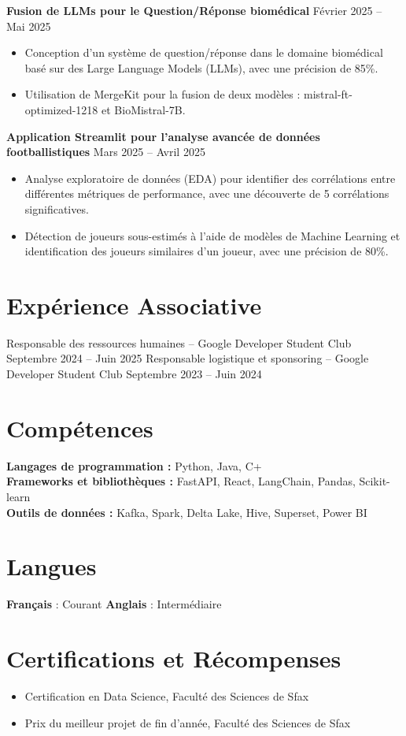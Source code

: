 \documentclass[9pt]{article}
\newcommand{\cvitem}[2]{#2}
\begin{document}
\textbf{Fusion de LLMs pour le Question/Réponse biomédical} \hfill Février 2025 -- Mai 2025
\begin{itemize}[itemsep=-0.2em]
    \item Conception d'un système de question/réponse dans le domaine biomédical basé sur des Large Language Models (LLMs), avec une précision de 85\%.
    \item Utilisation de MergeKit pour la fusion de deux modèles : mistral-ft-optimized-1218 et BioMistral-7B.
\end{itemize}

\textbf{Application Streamlit pour l'analyse avancée de données footballistiques} \hfill Mars 2025 -- Avril 2025
\begin{itemize}[itemsep=-0.2em]
    \item Analyse exploratoire de données (EDA) pour identifier des corrélations entre différentes métriques de performance, avec une découverte de 5 corrélations significatives.
    \item Détection de joueurs sous-estimés à l'aide de modèles de Machine Learning et identification des joueurs similaires d'un joueur, avec une précision de 80\%.
\end{itemize}

\section*{Expérience Associative}
Responsable des ressources humaines -- Google Developer Student Club \hfill Septembre 2024 -- Juin 2025
Responsable logistique et sponsoring -- Google Developer Student Club \hfill Septembre 2023 -- Juin 2024

\section*{Compétences}
\cvitem{}{%
  \textbf{Langages de programmation :} Python, Java, C\++ \\
  \textbf{Frameworks et bibliothèques :} FastAPI, React, LangChain, Pandas, Scikit-learn \\
  \textbf{Outils de données :} Kafka, Spark, Delta Lake, Hive, Superset, Power BI \\
}

\section*{Langues}
\begin{center}
\textbf{Français} : Courant \hspace{1em} \textbf{Anglais} : Intermédiaire
\end{center}

\section*{Certifications et Récompenses}
\begin{itemize}[itemsep=-0.2em] 
    \item Certification en Data Science, Faculté des Sciences de Sfax
    \item Prix du meilleur projet de fin d'année, Faculté des Sciences de Sfax
\end{itemize}
\end{document}
